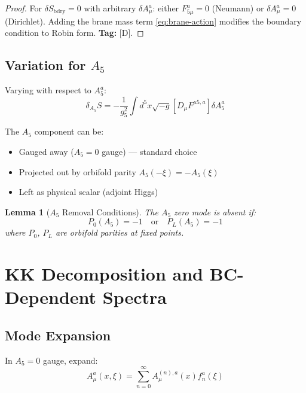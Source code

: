 \documentclass[11pt,a4paper]{article}
\newtheorem{lemma}[theorem]{Lemma}
\begin{document}
\begin{proof}
For $\delta S_{\text{bdry}} = 0$ with arbitrary $\delta A_\mu^a$: either
$F_{5\mu}^a = 0$ (Neumann) or $\delta A_\mu^a = 0$ (Dirichlet). Adding the brane
mass term \eqref{eq:brane-action} modifies the boundary condition to Robin form.
\textbf{Tag:} [D].
\end{proof}

\subsection{Variation for $A_5$}

Varying with respect to $A_5^a$:
\begin{equation}
  \delta_{A_5} S = -\frac{1}{g_5^2} \int d^5x \sqrt{-g}
    \left[ D_\mu F^{\mu 5,a} \right] \delta A_5^a
  \label{eq:a5-variation}
\end{equation}

The $A_5$ component can be:
\begin{itemize}
  \item Gauged away ($A_5 = 0$ gauge) --- standard choice
  \item Projected out by orbifold parity $A_5(-\xi) = -A_5(\xi)$
  \item Left as physical scalar (adjoint Higgs)
\end{itemize}

\begin{lemma}[$A_5$ Removal Conditions]
\label{lem:a5-removal}
The $A_5$ zero mode is absent if:
\begin{equation}
  P_0(A_5) = -1 \quad \text{or} \quad P_L(A_5) = -1
  \label{eq:a5-parity}
\end{equation}
where $P_0$, $P_L$ are orbifold parities at fixed points.
\end{lemma}

\section{KK Decomposition and BC-Dependent Spectra}
\label{sec:kk-spectra}

\subsection{Mode Expansion}

In $A_5 = 0$ gauge, expand:
\begin{equation}
  A_\mu^a(x,\xi) = \sum_{n=0}^{\infty} A_\mu^{(n),a}(x) f_n^a(\xi)
  \label{eq:kk-expansion}
\end{equation}
\end{document}
